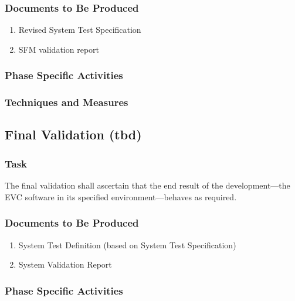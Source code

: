 \documentclass{template/openetcs_report}
\renewcommand{\tbd}[1]{\nthng{#1}}
\begin{document}
\subsubsection{Documents to Be Produced}
\label{sec:sfm-valid-docum-be-prod}

\begin{enumerate}
\item Revised System Test Specification
\item SFM validation report
\end{enumerate}

\subsubsection{Phase Specific Activities}
\label{sec:sfm-valid-phase-spec-activ}

\tbd{}

\subsubsection{Techniques and Measures}
\label{sec:sfm-valid-techniques-measures}

\tbd{}

\subsection{Final Validation (tbd)}
\label{sec:final-validation}

\subsubsection{Task}
\label{sec:final-valid-task}

The final validation shall ascertain that the end result of the
development---the EVC software in its specified environment---behaves
as required. 

\subsubsection{Documents to Be Produced}
\label{sec:final-valid-docum-be-prod}

\begin{enumerate}
\item System Test Definition (based on System Test Specification)
\item System Validation Report
\end{enumerate}

\subsubsection{Phase Specific Activities}
\label{sec:final-valid-phase-spec-activ}
\end{document}
